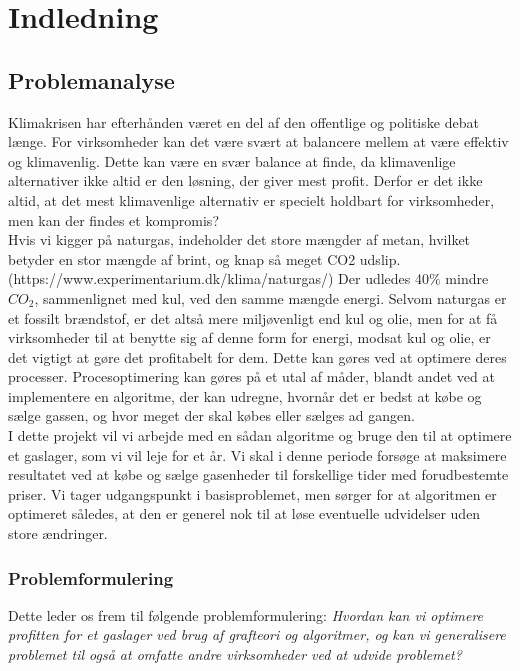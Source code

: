 \chapter{Indledning}
\section{Problemanalyse}
Klimakrisen har efterhånden været en del af den offentlige og politiske debat længe. For virksomheder kan det være svært at balancere mellem at være effektiv og klimavenlig. Dette kan være en svær balance at finde, da klimavenlige alternativer ikke altid er den løsning, der giver mest profit. Derfor er det ikke altid, at det mest klimavenlige alternativ er specielt holdbart for virksomheder, men kan der findes et kompromis? 
\\

Hvis vi kigger på naturgas, indeholder det store mængder af metan, hvilket betyder en stor mængde af brint, og knap så meget CO2 udslip. (https://www.experimentarium.dk/klima/naturgas/) Der udledes 40$\%$ mindre $CO_{2}$, sammenlignet med kul, ved den samme mængde energi. Selvom naturgas er et fossilt brændstof, er det altså mere miljøvenligt end kul og olie, men for at få virksomheder til at benytte sig af denne form for energi, modsat kul og olie, er det vigtigt at gøre det profitabelt for dem. Dette kan gøres ved at optimere deres processer.
Procesoptimering kan gøres på et utal af måder, blandt andet ved at implementere en algoritme, der kan udregne, hvornår det er bedst at købe og sælge gassen, og hvor meget der skal købes eller sælges ad gangen. 
\\

I dette projekt vil vi arbejde med en sådan algoritme og bruge den til at optimere et gaslager, som vi vil leje for et år. Vi skal i denne periode forsøge at maksimere resultatet ved at købe og sælge gasenheder til forskellige tider med forudbestemte priser. Vi tager udgangspunkt i basisproblemet, men sørger for at algoritmen er optimeret således, at den er generel nok til at løse eventuelle udvidelser uden store ændringer.

\subsection{Problemformulering}
Dette leder os frem til følgende problemformulering:
\textit{Hvordan kan vi optimere profitten for et gaslager ved brug af grafteori og algoritmer, og kan vi generalisere problemet til også at omfatte andre virksomheder ved at udvide problemet?}

